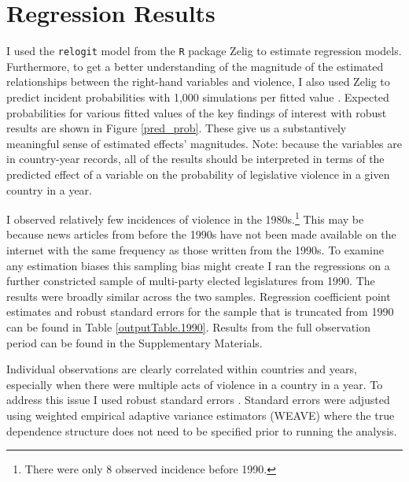 \documentclass[a4paper]{article}\usepackage[]{graphicx}\usepackage[]{color}
\begin{document}



\section{Regression Results}

I used the {\tt{relogit}} model from the {\tt{R}} package Zelig \citep{IMAIKingZelig2008} to estimate regression models. Furthermore, to get a better understanding of the magnitude of the estimated relationships between the right-hand variables and violence, I also used Zelig to predict incident probabilities with 1,000 simulations per fitted value \citep[]{King2002}. Expected probabilities for various fitted values of the key findings of interest with robust results are shown in Figure \ref{pred_prob}. These give us a substantively meaningful sense of estimated effects' magnitudes. Note: because the variables are in country-year records, all of the results should be interpreted in terms of the predicted effect of a variable on the probability of legislative violence in a given country in a year.

I observed relatively few incidences of violence in the 1980s.\footnote{There were only 8 observed incidence before 1990.} This may be because news articles from before the 1990s have not been made available on the internet with the same frequency as those written from the 1990s. To examine any estimation biases this sampling bias might create I ran the regressions on a further constricted sample of multi-party elected legislatures from 1990. The results were broadly similar across the two samples. Regression coefficient point estimates and robust standard errors for the sample that is truncated from 1990 can be found in Table \ref{outputTable.1990}. Results from the full observation period can be found in the Supplementary Materials. 

Individual observations are clearly correlated within countries and years, especially when there were multiple acts of violence in a country in a year. To address this issue I used robust standard errors \citep{Golder2006, Mainwaring2007}. Standard errors were adjusted using \cite{Lumley1999} weighted empirical adaptive variance estimators (WEAVE) where the true dependence structure does not need to be specified prior to running the analysis.
\end{document}
